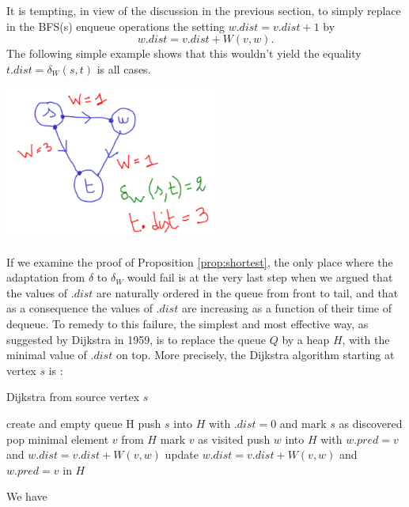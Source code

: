 \documentclass[12pt]{article}
\theoremstyle{plain}
\theoremstyle{remark}
\begin{document}
It is tempting, in view of the discussion in the previous section, to simply
replace in the BFS(s) enqueue operations the setting $w.dist = v.dist + 1$ by
$$
w.dist = v.dist + W(v,w).
$$
The following simple example shows that this wouldn't yield the equality $t.dist
= \delta_W(s,t)$ is all cases.
\begin{center}
	\includegraphics[width = 7cm]{data/weighted_missed.pdf}
\end{center}

If we examine the proof of Proposition \ref{prop:shortest}, the only place where
the adaptation from $\delta$ to $\delta_W$ would fail is at the very last step
when we argued that the values of $.dist$ are naturally ordered in the queue
from front to tail, and that as a consequence the values of $.dist$ are
increasing as a function of their time of dequeue. To remedy to this failure,
the simplest and most effective way, as suggested by Dijkstra in 1959, is to 
replace the queue $Q$ by a heap $H$, with the minimal value of $.dist$ on top.
More precisely, the Dijkstra algorithm starting at vertex $s$ is :

\begin{algorithm}[H]
\caption{Dijkstra from source vertex $s$}
\begin{algorithmic}
\State create and empty queue H
\State push $s$ into $H$ with $.dist = 0$ and mark $s$ as discovered
\State pop minimal element $v$ from $H$
	\State mark $v$ as visited
	\State push $w$ into $H$ with $w.pred = v$ and $w.dist = v.dist + W(v,w)$
	\State update $w.dist = v.dist + W(v,w)$ and $w.pred = v$ in $H$
	\EndIf
	\EndFor
	\EndWhile
	\EndFunction
\end{algorithmic}
\end{algorithm}

We have 
\end{document}
